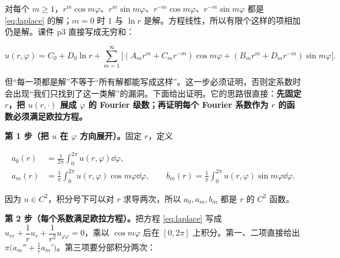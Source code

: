 
\label{sec:825}



对每个 $m\ge1$，$r^m\cos m\varphi$、$r^m\sin m\varphi$、$r^{-m}\cos m\varphi$、$r^{-m}\sin m\varphi$ 都是 \eqref{eq:laplace} 的解；$m=0$ 时 $1$ 与 $\ln r$ 是解。方程线性，所以有限个这样的项相加仍是解。课件 p3 直接写成无穷和：

\begin{equation}
u(r,\varphi)=C_0+D_0\ln r+\sum_{m=1}^{\infty}\Big[(A_mr^m+C_mr^{-m})\cos m\varphi+(B_mr^m+D_mr^{-m})\sin m\varphi\Big].
\label{eq:general}
\end{equation}

但“每一项都是解”不等于“所有解都能写成这样”。这一步必须证明，否则定系数时会出现“我们只找到了这一类解”的漏洞。下面给出证明。它的思路很直接：\textbf{先固定 $r$，把 $u(r,\cdot)$ 展成 $\varphi$ 的 Fourier 级数；再证明每个 Fourier 系数作为 $r$ 的函数必须满足欧拉方程。}



\pfline

\textbf{第 1 步（把 $u$ 在 $\varphi$ 方向展开）。}固定 $r$，定义

\begin{align*}
a_0(r)&=\frac1{2\pi}\int_0^{2\pi}u(r,\varphi)\dd\varphi,\\
a_m(r)&=\frac1\pi\int_0^{2\pi}u(r,\varphi)\cos m\varphi\dd\varphi,\qquad
b_m(r)=\frac1\pi\int_0^{2\pi}u(r,\varphi)\sin m\varphi\dd\varphi .
\end{align*}

因为 $u\in C^2$，积分号下可以对 $r$ 求导两次，所以 $a_0,a_m,b_m$ 都是 $r$ 的 $C^2$ 函数。

\textbf{第 2 步（每个系数满足欧拉方程）。}把方程 \eqref{eq:laplace} 写成 $u_{rr}+\dfrac1ru_r+\dfrac1{r^2}u_{\varphi\varphi}=0$，乘以 $\cos m\varphi$ 后在 $[0,2\pi]$ 上积分。第一、二项直接给出 $\pi\big(a_m''+\frac1ra_m'\big)$。第三项要分部积分两次：

